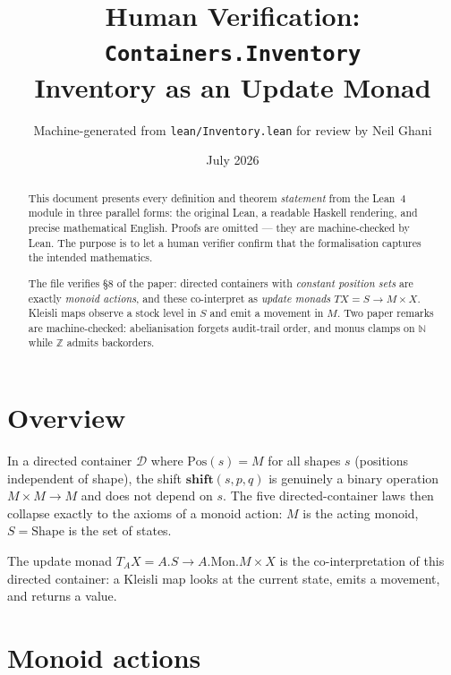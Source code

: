 \documentclass[11pt,a4paper]{article}
\title{Human Verification: \texttt{Containers.Inventory}\\[4pt]
  \large Inventory as an Update Monad}
\author{Machine-generated from \texttt{lean/Inventory.lean} for review by Neil Ghani}
\date{July 2026}
\begin{document}
\maketitle

\begin{abstract}
This document presents every definition and theorem \emph{statement} from the
Lean~4 module  in three parallel forms: the
original Lean, a readable Haskell rendering, and precise mathematical English.
Proofs are omitted --- they are machine-checked by Lean.  The purpose is to
let a human verifier confirm that the formalisation captures the intended
mathematics.

The file verifies \S8 of the paper: directed containers with
\emph{constant position sets} are exactly \emph{monoid actions}, and these
co-interpret as \emph{update monads} $T X = S \to M \times X$.  Kleisli maps
observe a stock level in $S$ and emit a movement in $M$.  Two paper remarks
are machine-checked: abelianisation forgets audit-trail order, and monus
clamps on $\mathbb{N}$ while $\mathbb{Z}$ admits backorders.
\end{abstract}

\tableofcontents
\bigskip

\section{Overview}

In a directed container $\mathcal{D}$ where $\mathrm{Pos}(s) = M$ for all
shapes $s$ (positions independent of shape), the shift $\mathbf{shift}(s,
p, q)$ is genuinely a binary operation $M \times M \to M$ and does not depend
on $s$.  The five directed-container laws then collapse exactly to the axioms
of a monoid action: $M$ is the acting monoid, $S = \mathrm{Shape}$ is the set
of states.

The update monad $T_A X = A.S \to A.\mathrm{Mon}.M \times X$ is the
co-interpretation of this directed container: a Kleisli map looks at the
current state, emits a movement, and returns a value.


\section{Monoid actions}
\end{document}
